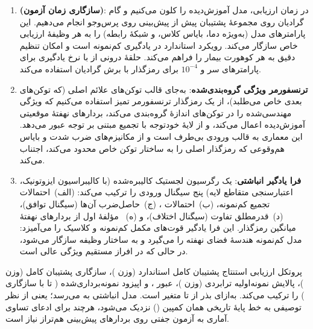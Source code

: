 \begin{enumerate}
\item \textbf{ (سازگاری زمان آزمون)}: در زمان ارزیابی، مدل آموزش‌دیده را کلون می‌کنیم و  گام گرادیان روی مجموعۀ پشتیبان پیش از پیش‌بینی روی پرس‌وجو انجام می‌دهیم. این پارامترهای مدل (به‌ویژه دما، بایاس کلاس، و شبکۀ رابطه) را به هر وظیفۀ ارزیابی خاص سازگار می‌کند.  رویکرد استاندارد در یادگیری کم‌نمونه است و امکان تنظیم دقیق به هر کوهورت بیمار را فراهم می‌کند. حلقۀ درونی از  با نرخ یادگیری  برای پارامترهای سر و $10^{-4}$ برای رمزگذار با برش گرادیان  استفاده می‌کند.

\item \textbf{ترنسفورمر ویژگی گروه‌بندی‌شده}: به‌جای قالب توکن‌های علائم  اصلی (که توکن‌های بعدی خاص می‌طلبد)، از یک رمزگذار ترنسفورمر تمیز استفاده می‌کنیم که  ویژگی مهندسی‌شده را در توکن‌های اندازۀ  گروه‌بندی می‌کند، بردارهای نهفتۀ موقعیتی آموزش‌دیده اعمال می‌کند، و از  لایۀ خودتوجه با تجمیع مبتنی بر توجه عبور می‌دهد. این معماری به قالب ورودی بی‌طرف است و از مکانیزم‌های ضرب شدت و بایاس هم‌وقوعی که رمزگذار  اصلی را به ساختار توکن خاص محدود می‌کند، اجتناب می‌کند.

\item \textbf{فرا یادگیر انباشتی}: یک رگرسیون لجستیک کالیبره‌شده (با کالیبراسیون ایزوتونیک، اعتبارسنجی متقاطع ‌لایه) پنج سیگنال ورودی را ترکیب می‌کند: (الف)~احتمالات تجمیع کم‌نمونه، (ب)~احتمالات ، (ج)~حاصل‌ضرب آن‌ها (سیگنال توافق)، (د)~قدرمطلق تفاوت (سیگنال اختلاف)، و (ه)~ مؤلفۀ اول  از بردارهای نهفتۀ میانگین رمزگذار. این فرا یادگیر قوت‌های مکمل کم‌نمونه و کلاسیک را می‌آمیزد: مدل کم‌نمونه هندسۀ فضای نهفته را می‌گیرد و به ساختار وظیفه سازگار می‌شود، در حالی که  در افراز مستقیم ویژگی عالی است.
\end{enumerate}

پروتکل ارزیابی استنتاج پشتیبان کامل استاندارد (وزن \LTRformula{2\times})، سازگاری پشتیبان کامل  (وزن \LTRformula{3\times})، پالایش نمونه‌اولیه ترابردی (وزن \LTRformula{2\times})،  عبور ، و  اپیزود نمونه‌برداری‌شده ( تا با سازگاری ) را ترکیب می‌کند.  به‌ازای بذر از  تا  متغیر است. مدل انباشتی به  \textbf{} \cnum{[0.684, 0.783]} می‌رسد؛ یعنی از نظر توصیفی به خط پایۀ  تاریخی همان کمپین () نزدیک می‌شود، هرچند برای ادعای تساوی آماری به آزمون جفتی روی بردارهای پیش‌بینی هم‌تراز نیاز است.

